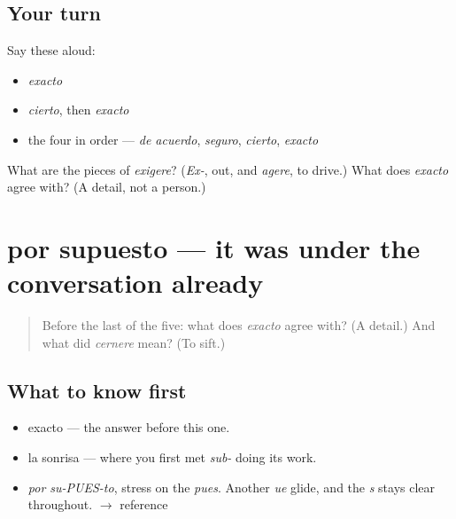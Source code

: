 \subsection*{Your turn}
Say these aloud:

\begin{itemize}
\raggedright
  \item \emph{exacto}
  \item \emph{cierto}, then \emph{exacto}
  \item the four in order — \emph{de acuerdo}, \emph{seguro}, \emph{cierto}, \emph{exacto}
\end{itemize}

\begin{tcolorbox}[breakable,colback=teal!4,colframe=teal!35!black,title={Before you move on}]
What are the pieces of \emph{exigere}? (\emph{Ex-}, out, and \emph{agere}, to drive.) What does \emph{exacto} agree with? (A detail, not a person.)
\end{tcolorbox}
\section[por supuesto]{por supuesto — it was under the conversation already}

\label{lesson:ES-C284-por-supuesto}



\begin{quote}
Before the last of the five: what does \emph{exacto} agree with? (A detail.) And what did \emph{cernere} mean? (To sift.)
\end{quote}

\subsection*{What to know first}
\begin{itemize}
\raggedright
  \item exacto — the answer before this one.
  \item la sonrisa — where you first met \emph{sub-} doing its work.
\end{itemize}

\begin{sounds}
\begin{itemize}
\raggedright
  \item \emph{por su-PUES-to}, stress on the \emph{pues}. Another \emph{ue} glide, and the \emph{s} stays clear throughout. $\to$ reference
\end{itemize}
\end{sounds}

